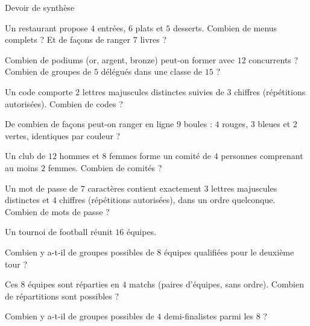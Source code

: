 \begin{exercice}[3]{Devoir de synthèse}
\begin{questions}
  \item Un restaurant propose $4$ entrées, $6$ plats et $5$ desserts. Combien de menus complets ? Et de façons de ranger $7$ livres ?
  \item Combien de podiums (or, argent, bronze) peut-on former avec $12$ concurrents ? Combien de groupes de $5$ délégués dans une classe de $15$ ?
\end{questions}
\begin{questions}[resume]
  \item Un code comporte $2$ lettres majuscules distinctes suivies de $3$ chiffres (répétitions autorisées). Combien de codes ?
  \item De combien de façons peut-on ranger en ligne $9$ boules : $4$ rouges, $3$ bleues et $2$ vertes, identiques par couleur ?
  \item Un club de $12$ hommes et $8$ femmes forme un comité de $4$ personnes comprenant au moins $2$ femmes. Combien de comités ?
  \item Un mot de passe de $7$ caractères contient exactement $3$ lettres majuscules distinctes et $4$ chiffres (répétitions
    autorisées), dans un ordre quelconque. Combien de mots de passe ?
\end{questions}
Un tournoi de football réunit $16$ équipes.
\begin{questions}[resume]
  \item Combien y a-t-il de groupes possibles de $8$ équipes qualifiées pour le deuxième tour ?
  \item Ces $8$ équipes sont réparties en $4$ matchs (paires d'équipes, sans ordre). Combien de répartitions sont possibles ?
  \item Combien y a-t-il de groupes possibles de $4$ demi-finalistes parmi les $8$ ?
\end{questions}
\end{exercice}

